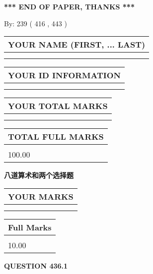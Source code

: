\documentclass{ctexart}
\begin{document}
   
 \vspace{0.2in}
 
   
   
   
   
\vspace{1.0in} 
{\textbf{\large{ *** END OF PAPER, THANKS *** }}} 
   
   
\hspace{1.0in} By: 
 239 ( 416 ,  443 )
   
   
   
   
\newpage 
\setcounter{page}{ 
   436001 } 
   
   
   
   
\noindent\begin{tabular}{|l|}
\hline
YOUR NAME (FIRST, ... LAST)  \\
\hline
 \\ 
 \\ 
\hline
\end{tabular}
\hspace{0.05in} \begin{tabular}{|l|}
\hline
 YOUR   ID   INFORMATION  \\
\hline
 \\ 
 \\ 
\hline
\end{tabular}
   
   
\vspace{0.2in}\noindent\begin{tabular}{|l|}
\hline
YOUR TOTAL MARKS  \\
\hline
 \\ 
 \\ 
\hline
\end{tabular}
\hspace{0.05in} \begin{tabular}{|l|}
\hline
TOTAL FULL MARKS  \\
\hline
 \\ 
100.00 \\
\hline
\end{tabular}
   
   
 \vspace{0.2in}
{\LARGE {\textbf{ 八道算术和两个选择题}}}
   
   
  
\vspace{0.2in}
  
\noindent\begin{tabular}{|l|}
\hline
 YOUR MARKS  \\
\hline
 \\ 
 \\ 
\hline
\end{tabular}
\hspace{0.05in} \begin{tabular}{|l|}
\hline
 Full Marks  \\
\hline
 \\ 
10.00 \\
\hline
\end{tabular}
{\textbf{\Large{QUESTION
436.1 
}}}
  
\end{document}

